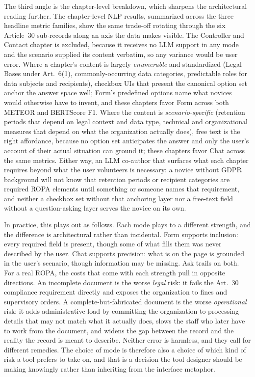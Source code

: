 The third angle is the chapter-level breakdown, which sharpens
the architectural reading further. The chapter-level NLP
results, summarized across the three headline metric families,
show the same trade-off rotating through the six Article~30
sub-records along an axis the data makes visible. The Controller and Contact chapter is excluded, because it
receives no LLM support in any mode and the scenario supplied
its content verbatim, so any variance would be user error. Where a chapter's content is largely \emph{enumerable}
and standardized (Legal Bases under Art.~6(1),
commonly-occurring data categories, predictable roles for data
subjects and recipients), checkbox UIs that present the
canonical option set anchor the answer space well; Form's
predefined options name what novices would otherwise have to
invent, and these chapters favor Form across both METEOR and
BERTScore F1. Where the content is \emph{scenario-specific}
(retention periods that depend on legal context and data type,
technical and organizational measures that depend on what the
organization actually does), free text is the right affordance,
because no option set anticipates the answer and only the
user's account of their actual situation can ground it; these
chapters favor Chat across the same metrics. Either way, an
LLM co-author that surfaces what each chapter requires beyond
what the user volunteers is necessary: a novice without GDPR
background will not know that retention periods or recipient
categories are required ROPA elements until something or
someone names that requirement, and neither a checkbox set
without that anchoring layer nor a free-text field without a
question-asking layer serves the novice on its own.


In practice, this plays out as follows. Each mode plays to a different
strength, and the difference is architectural rather than
incidental. Form supports inclusion: every required field is
present, though some of what fills them was never described
by the user. Chat supports precision: what is on the page
is grounded in the user's scenario, though information may be missing.
Ask trails on both.
For a real ROPA, the costs that come with each strength pull in
opposite directions. An incomplete document
is the worse \emph{legal} risk: it fails the Art.~30 compliance
requirement directly and exposes the organization to fines and
supervisory orders. A complete-but-fabricated document is the
worse \emph{operational} risk: it adds administrative load by
committing the organization to processing details that may not
match what it actually does, slows the staff who later have to
work from the document, and widens the gap between the record
and the reality the record is meant to describe. Neither error
is harmless, and they call for different remedies. The choice
of mode is therefore also a choice of which kind of risk a tool
prefers to take on, and that is a decision the tool designer
should be making knowingly rather than inheriting from the
interface metaphor.

